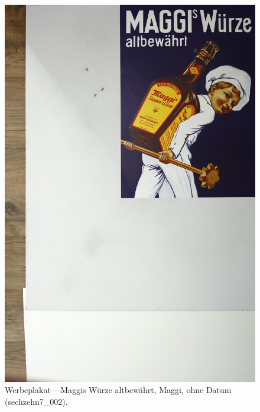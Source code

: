 \documentclass[a4paper,12pt,ngerman]{article}
\begin{document}
\newpage
\begin{figure}[ht]
\includegraphics[width=\linewidth]{Abbildung_11_(sechzehn7_002)}
\centering
\caption{Werbeplakat -- Maggis Würze altbewährt, Maggi, ohne Datum (sechzehn7\_002).}
\end{figure}
\end{document}
